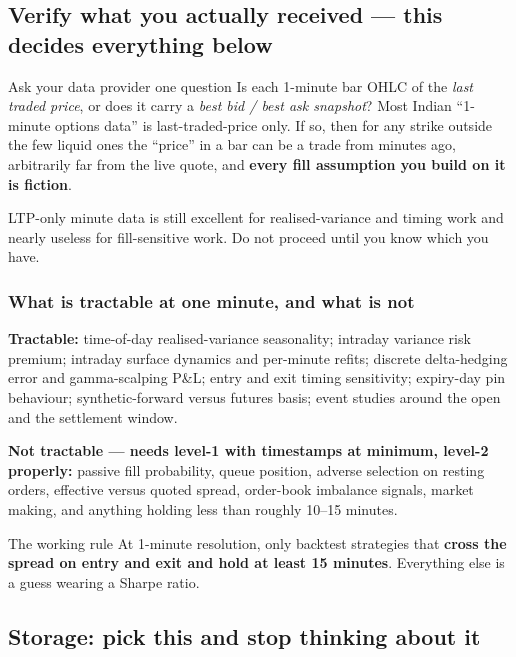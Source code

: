\documentclass[11pt,a4paper]{article}
\begin{document}
\subsection{Verify what you actually received --- this decides everything below}

\begin{keyfact}{Ask your data provider one question}
Is each 1-minute bar OHLC of the \emph{last traded price}, or does it carry a
\emph{best bid / best ask snapshot}? Most Indian ``1-minute options data'' is
last-traded-price only. If so, then for any strike outside the few liquid ones the
``price'' in a bar can be a trade from minutes ago, arbitrarily far from the live
quote, and \textbf{every fill assumption you build on it is fiction}.

LTP-only minute data is still excellent for realised-variance and timing work and
nearly useless for fill-sensitive work. Do not proceed until you know which you have.
\end{keyfact}

\subsubsection{What is tractable at one minute, and what is not}

\textbf{Tractable:} time-of-day realised-variance seasonality; intraday variance
risk premium; intraday surface dynamics and per-minute refits; discrete
delta-hedging error and gamma-scalping P\&L; entry and exit timing sensitivity;
expiry-day pin behaviour; synthetic-forward versus futures basis; event studies
around the open and the settlement window.

\textbf{Not tractable --- needs level-1 with timestamps at minimum, level-2
properly:} passive fill probability, queue position, adverse selection on resting
orders, effective versus quoted spread, order-book imbalance signals, market
making, and anything holding less than roughly 10--15 minutes.

\begin{keyfact}{The working rule}
At 1-minute resolution, only backtest strategies that \textbf{cross the spread on
entry and exit and hold at least 15 minutes}. Everything else is a guess wearing a
Sharpe ratio.
\end{keyfact}

\subsection{Storage: pick this and stop thinking about it}
\label{sec:storage}
\end{document}
